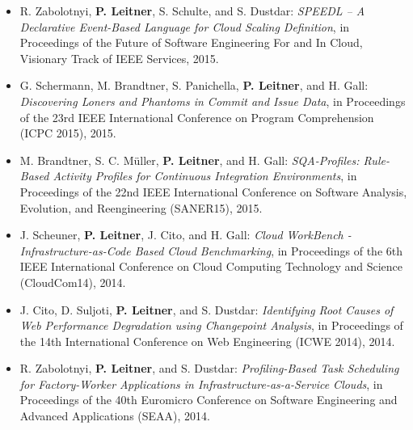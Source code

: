\documentclass[paper=letter,fontsize=11pt]{scrartcl} %
\begin{document}
\begin{itemize}
      \item R. Zabolotnyi, \textbf{P. Leitner}, S. Schulte, and S. Dustdar: \emph{SPEEDL -- A Declarative Event-Based Language for Cloud Scaling Definition}, in Proceedings of the Future of Software Engineering For and In Cloud, Visionary Track of IEEE Services, 2015.
  \item G. Schermann, M. Brandtner, S. Panichella, \textbf{P. Leitner}, and H. Gall: \emph{Discovering Loners and Phantoms in Commit and Issue Data}, in Proceedings of the 23rd IEEE International Conference
on Program Comprehension (ICPC 2015), 2015.
  \item M. Brandtner, S. C. M\"uller, \textbf{P. Leitner}, and H. Gall: \emph{SQA-Profiles: Rule-Based Activity Profiles for Continuous Integration Environments}, in Proceedings of the 22nd IEEE International Conference on Software Analysis, Evolution, and Reengineering (SANER15), 2015.
  \item J. Scheuner, \textbf{P. Leitner}, J. Cito, and H. Gall: \emph{Cloud WorkBench - Infrastructure-as-Code Based Cloud Benchmarking}, in Proceedings of the 6th IEEE International Conference on Cloud Computing Technology and Science (CloudCom14), 2014.
  \item J. Cito, D. Suljoti, \textbf{P. Leitner}, and S. Dustdar: \emph{Identifying Root Causes of Web Performance Degradation using Changepoint Analysis}, in Proceedings of the 14th International Conference on Web Engineering (ICWE 2014), 2014.
 \item R. Zabolotnyi, \textbf{P. Leitner}, and S. Dustdar: \emph{Profiling-Based Task Scheduling for Factory-Worker Applications in Infrastructure-as-a-Service Clouds}, in Proceedings of the 40th Euromicro Conference on Software Engineering and Advanced Applications (SEAA), 2014.

\end{itemize}
\end{document}
